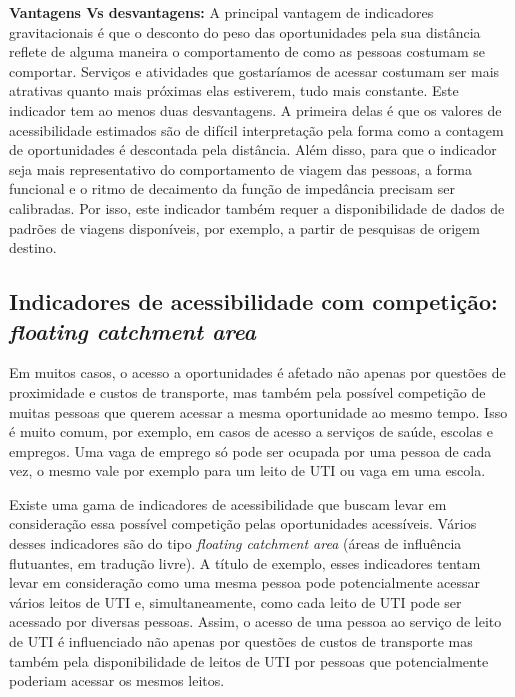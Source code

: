 \documentclass[
  letterpaper,
  DIV=11,
  numbers=noendperiod]{scrreprt}
\begin{document}
\textbf{Vantagens Vs desvantagens:} A principal vantagem de indicadores
gravitacionais é que o desconto do peso das oportunidades pela sua
distância reflete de alguma maneira o comportamento de como as pessoas
costumam se comportar. Serviços e atividades que gostaríamos de acessar
costumam ser mais atrativas quanto mais próximas elas estiverem, tudo
mais constante. Este indicador tem ao menos duas desvantagens. A
primeira delas é que os valores de acessibilidade estimados são de
difícil interpretação pela forma como a contagem de oportunidades é
descontada pela distância. Além disso, para que o indicador seja mais
representativo do comportamento de viagem das pessoas, a forma funcional
e o ritmo de decaimento da função de impedância precisam ser calibradas.
Por isso, este indicador também requer a disponibilidade de dados de
padrões de viagens disponíveis, por exemplo, a partir de pesquisas de
origem destino.

\hypertarget{indicadores-de-acessibilidade-com-competiuxe7uxe3o-floating-catchment-area}{%
\subsection{\texorpdfstring{Indicadores de acessibilidade com
competição: \emph{floating catchment
area}}{Indicadores de acessibilidade com competição: floating catchment area}}\label{indicadores-de-acessibilidade-com-competiuxe7uxe3o-floating-catchment-area}}

Em muitos casos, o acesso a oportunidades é afetado não apenas por
questões de proximidade e custos de transporte, mas também pela possível
competição de muitas pessoas que querem acessar a mesma oportunidade ao
mesmo tempo. Isso é muito comum, por exemplo, em casos de acesso a
serviços de saúde, escolas e empregos. Uma vaga de emprego só pode ser
ocupada por uma pessoa de cada vez, o mesmo vale por exemplo para um
leito de UTI ou vaga em uma escola.

Existe uma gama de indicadores de acessibilidade que buscam levar em
consideração essa possível competição pelas oportunidades acessíveis.
Vários desses indicadores são do tipo \emph{floating catchment area}
(áreas de influência flutuantes, em tradução livre). A título de
exemplo, esses indicadores tentam levar em consideração como uma mesma
pessoa pode potencialmente acessar vários leitos de UTI e,
simultaneamente, como cada leito de UTI pode ser acessado por diversas
pessoas. Assim, o acesso de uma pessoa ao serviço de leito de UTI é
influenciado não apenas por questões de custos de transporte mas também
pela disponibilidade de leitos de UTI por pessoas que potencialmente
poderiam acessar os mesmos leitos.
\end{document}

